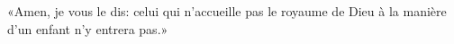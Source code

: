\encetemps \jesusdisciples
	«Amen, je vous le dis:
	celui qui n’accueille pas le royaume de Dieu à la manière d’un enfant
		n’y entrera pas.»
